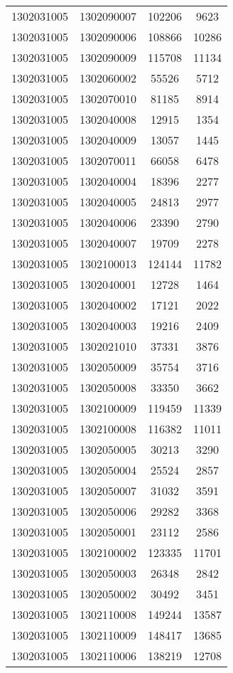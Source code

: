 \begin{longtable}{llcc}
1302031005 & 1302090007 & 102206 & 9623\\
1302031005 & 1302090006 & 108866 & 10286\\
1302031005 & 1302090009 & 115708 & 11134\\
1302031005 & 1302060002 & 55526 & 5712\\
1302031005 & 1302070010 & 81185 & 8914\\
1302031005 & 1302040008 & 12915 & 1354\\
1302031005 & 1302040009 & 13057 & 1445\\
1302031005 & 1302070011 & 66058 & 6478\\
1302031005 & 1302040004 & 18396 & 2277\\
1302031005 & 1302040005 & 24813 & 2977\\
1302031005 & 1302040006 & 23390 & 2790\\
1302031005 & 1302040007 & 19709 & 2278\\
1302031005 & 1302100013 & 124144 & 11782\\
1302031005 & 1302040001 & 12728 & 1464\\
1302031005 & 1302040002 & 17121 & 2022\\
1302031005 & 1302040003 & 19216 & 2409\\
1302031005 & 1302021010 & 37331 & 3876\\
1302031005 & 1302050009 & 35754 & 3716\\
1302031005 & 1302050008 & 33350 & 3662\\
1302031005 & 1302100009 & 119459 & 11339\\
1302031005 & 1302100008 & 116382 & 11011\\
1302031005 & 1302050005 & 30213 & 3290\\
1302031005 & 1302050004 & 25524 & 2857\\
1302031005 & 1302050007 & 31032 & 3591\\
1302031005 & 1302050006 & 29282 & 3368\\
1302031005 & 1302050001 & 23112 & 2586\\
1302031005 & 1302100002 & 123335 & 11701\\
1302031005 & 1302050003 & 26348 & 2842\\
1302031005 & 1302050002 & 30492 & 3451\\
1302031005 & 1302110008 & 149244 & 13587\\
1302031005 & 1302110009 & 148417 & 13685\\
1302031005 & 1302110006 & 138219 & 12708\\

\end{longtable}
